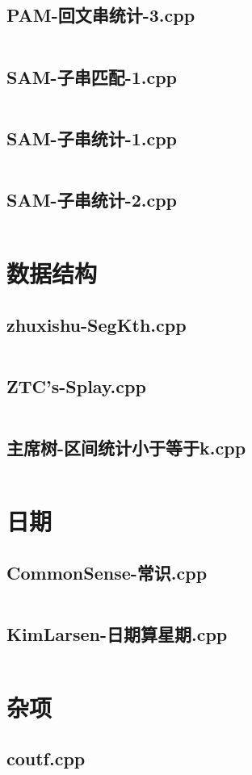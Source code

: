 \documentclass[a4paper,landscape,twocolumn]{article} %
\begin{document}
\subsection{PAM-回文串统计-3.cpp}
\inputminted{c++}{./codes/009}
\subsection{SAM-子串匹配-1.cpp}
\inputminted{c++}{./codes/010}
\subsection{SAM-子串统计-1.cpp}
\inputminted{c++}{./codes/011}
\subsection{SAM-子串统计-2.cpp}
\inputminted{c++}{./codes/012}
\section{数据结构}
\subsection{zhuxishu-SegKth.cpp}
\inputminted{c++}{./codes/013}
\subsection{ZTC's-Splay.cpp}
\inputminted{c++}{./codes/014}
\subsection{主席树-区间统计小于等于k.cpp}
\inputminted{c++}{./codes/015}
\section{日期}
\subsection{CommonSense-常识.cpp}
\inputminted{c++}{./codes/016}
\subsection{KimLarsen-日期算星期.cpp}
\inputminted{c++}{./codes/017}
\section{杂项}
\subsection{coutf.cpp}
\inputminted{c++}{./codes/018}
\end{document}
